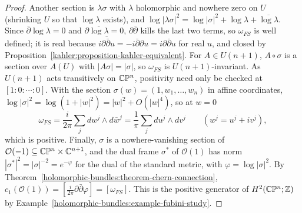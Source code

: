 \begin{proof}
Another section is $\lambda\sigma$ with $\lambda$ holomorphic and nowhere zero on $U$ (shrinking $U$ so that $\log\lambda$ exists), and
$\log|\lambda\sigma|^2 = \log|\sigma|^2 + \log\lambda + \overline{\log\lambda}$. Since $\bar\partial\log\lambda = 0$ and
$\partial\overline{\log\lambda} = 0$, $\partial\bar\partial$ kills the last two terms, so $\omega_{FS}$ is well defined; it is real because
$\overline{i\partial\bar\partial u} = -i\bar\partial\partial u = i\partial\bar\partial u$ for real $u$, and closed by
Proposition~\ref{kahler:proposition-kahler-equivalent}. For $A \in U(n+1)$, $A \circ \sigma$ is a section over $A(U)$ with
$|A\sigma| = |\sigma|$, so $\omega_{FS}$ is $U(n+1)$-invariant. As $U(n+1)$ acts transitively on $\mathbb{C}\mathbb{P}^n$, positivity need only be checked
at $[1 : 0 : \cdots : 0]$. With the section $\sigma(w) = (1, w_1, \ldots, w_n)$ in affine coordinates,
$\log|\sigma|^2 = \log(1 + |w|^2) = |w|^2 + O(|w|^4)$, so at $w = 0$
\[
\omega_{FS} = \frac{i}{2\pi}\sum_jdw^j \wedge d\bar w^j = \frac1\pi\sum_jdu^j \wedge dv^j \qquad (w^j = u^j + iv^j),
\]
which is positive. Finally, $\sigma$ is a nowhere-vanishing section of $\mathcal{O}(-1) \subseteq \mathbb{C}\mathbb{P}^n \times \mathbb{C}^{n+1}$, and the dual
frame $\sigma^*$ of $\mathcal{O}(1)$ has norm $|\sigma^*|^2 = |\sigma|^{-2} = e^{-\varphi}$ for the dual of the standard metric, with
$\varphi = \log|\sigma|^2$. By Theorem~\ref{holomorphic-bundles:theorem-chern-connection}, $c_1(\mathcal{O}(1)) = [\frac{i}{2\pi}\partial\bar\partial\varphi] = [\omega_{FS}]$.
This is the positive generator of $H^2(\mathbb{C}\mathbb{P}^n; \mathbb{Z})$ by Example~\ref{holomorphic-bundles:example-fubini-study}.
\end{proof}

